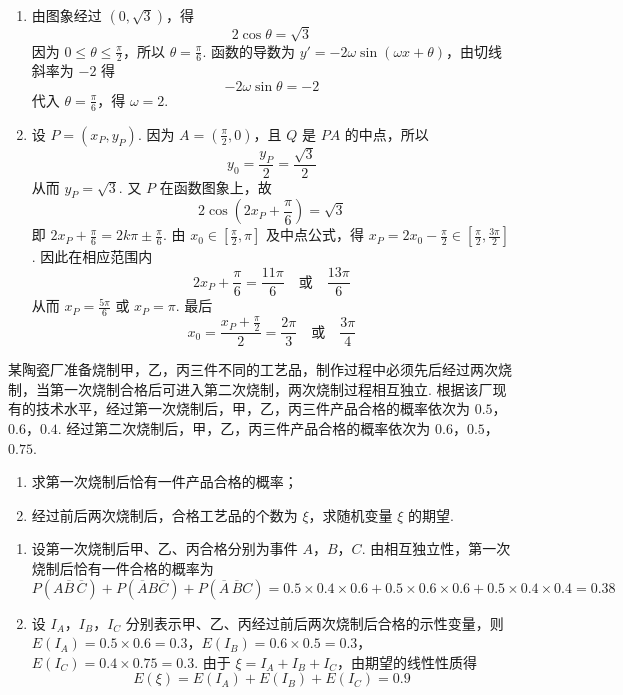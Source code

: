 \begin{solution}
\begin{enumerate}
\item 由图象经过 \((0,\sqrt3)\)，得
\[
2\cos\theta=\sqrt3
\]
因为 \(0\leqslant\theta\leqslant\frac\pi2\)，所以 \(\theta=\frac\pi6\). 函数的导数为 \(y'=-2\omega\sin(\omega x+\theta)\)，由切线斜率为 \(-2\) 得
\[
-2\omega\sin\theta=-2
\]
代入 \(\theta=\frac\pi6\)，得 \(\omega=2\).

\item 设 \(P=(x_P,y_P)\). 因为 \(A=\left(\frac\pi2,0\right)\)，且 \(Q\) 是 \(PA\) 的中点，所以
\[
y_0=\frac{y_P}{2}=\frac{\sqrt3}{2}
\]
从而 \(y_P=\sqrt3\). 又 \(P\) 在函数图象上，故
\[
2\cos\left(2x_P+\frac\pi6\right)=\sqrt3
\]
即 \(2x_P+\frac\pi6=2k\pi\pm\frac\pi6\). 由 \(x_0\in\left[\frac\pi2,\pi\right]\) 及中点公式，得 \(x_P=2x_0-\frac\pi2\in\left[\frac\pi2,\frac{3\pi}{2}\right]\). 因此在相应范围内
\[
2x_P+\frac\pi6=\frac{11\pi}{6}\quad\text{或}\quad\frac{13\pi}{6}
\]
从而 \(x_P=\frac{5\pi}{6}\) 或 \(x_P=\pi\). 最后
\[
x_0=\frac{x_P+\frac\pi2}{2}=\frac{2\pi}{3}\quad\text{或}\quad\frac{3\pi}{4}
\]
\end{enumerate}
\end{solution}

\begin{problem}
某陶瓷厂准备烧制甲，乙，丙三件不同的工艺品，制作过程中必须先后经过两次烧制，当第一次烧制合格后可进入第二次烧制，两次烧制过程相互独立. 根据该厂现有的技术水平，经过第一次烧制后，甲，乙，丙三件产品合格的概率依次为 \(0.5\)，\(0.6\)，\(0.4\). 经过第二次烧制后，甲，乙，丙三件产品合格的概率依次为 \(0.6\)，\(0.5\)，\(0.75\).

\begin{enumerate}
\item 求第一次烧制后恰有一件产品合格的概率；
\item 经过前后两次烧制后，合格工艺品的个数为 \(\xi\)，求随机变量 \(\xi\) 的期望.
\end{enumerate}
\end{problem}

\begin{solution}
\begin{enumerate}
\item 设第一次烧制后甲、乙、丙合格分别为事件 \(A\)，\(B\)，\(C\). 由相互独立性，第一次烧制后恰有一件合格的概率为
\[
P(A\overline B\,\overline C)+P(\overline A B\overline C)+P(\overline A\,\overline B C)
=0.5\times0.4\times0.6+0.5\times0.6\times0.6+0.5\times0.4\times0.4
=0.38
\]

\item 设 \(I_A\)，\(I_B\)，\(I_C\) 分别表示甲、乙、丙经过前后两次烧制后合格的示性变量，则
\(E(I_A)=0.5\times0.6=0.3\)，\(E(I_B)=0.6\times0.5=0.3\)，\(E(I_C)=0.4\times0.75=0.3\).
由于 \(\xi=I_A+I_B+I_C\)，由期望的线性性质得
\[
E(\xi)=E(I_A)+E(I_B)+E(I_C)=0.9
\]
\end{enumerate}
\end{solution}

